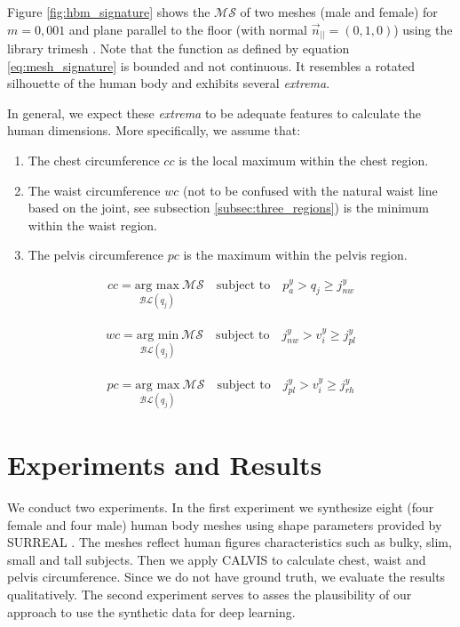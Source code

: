\documentclass[runningheads, orivec]{llncs}
\begin{document}
Figure \ref{fig:hbm_signature} shows the $\mathcal{MS}$ of two meshes (male 
and female) for 
$m=0,001$ and plane parallel to the floor (with normal 
$\vec{n}_{||} = (0, 
1,0)$) using the library trimesh \cite{trimesh}. Note that the function as 
defined by equation \ref{eq:mesh_signature} is bounded and not continuous. It 
resembles a rotated silhouette of the human body and exhibits several 
\textit{extrema}.

In general, we expect these \textit{extrema} to be adequate features to 
calculate the human dimensions. More specifically, we assume that:
\begin{enumerate}
	\item The chest circumference $cc$ is the local maximum within the chest 
	region.
	\item The waist circumference $wc$ (not to be confused with the natural 
	waist line based on the joint, see subsection \ref{subsec:three_regions}) 
	is the minimum within the waist region.	
	\item The pelvis circumference $pc$ is the maximum within the pelvis region.
\end{enumerate}

\begin{align}\label{eq:cc}
cc = \underset{\mathcal{BL}(q_j)}{\text{arg max}}\ \mathcal{MS} \quad 
\text{subject 
to} \quad p^y_a > q_j \geq j^y_{nw}
\end{align}

\begin{align}\label{eq:wc}
wc = \underset{\mathcal{BL}(q_j)}{\text{arg min}}\ \mathcal{MS} \quad 
\text{subject 
	to} \quad j^y_{nw} > v^y_i \geq j^y_{pl}
\end{align}

\begin{align}\label{eq:pc}
pc = \underset{\mathcal{BL}(q_j)}{\text{arg max}}\ \mathcal{MS} \quad 
\text{subject 
	to} \quad j^y_{pl} > v^y_i \geq j^y_{rh}
\end{align}

\section{Experiments and Results}

We conduct two experiments. In the first experiment we synthesize eight (four 
female and four male) human body meshes using shape parameters provided by 
SURREAL \cite{varol17_surreal}.
The meshes reflect human figures characteristics such as bulky, slim, small and 
tall subjects. Then we apply CALVIS to calculate chest, waist and pelvis 
circumference. Since we do not have ground truth, we evaluate the results 
qualitatively.
The second 
experiment serves to asses the plausibility of our approach to use the 
synthetic data for deep learning.
\end{document}
